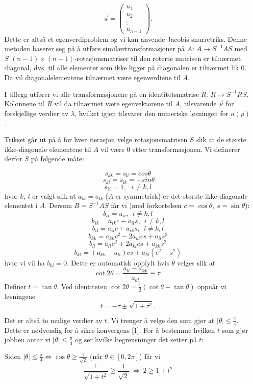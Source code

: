 \documentclass[norsk, 12pt]{article}
\newcommand{\f}{\frac}
\begin{document}
$$ \vec u  = \left(\begin{matrix} u_1 \\ u_2 \\ \vdots \\u_{n-1} \end{matrix}\right).$$
Dette er altså et egenverdiproblem og vi kan anvende Jacobis snurretriks.
Denne metoden baserer seg på å utføre similærtransformasjoner på $A$: $A \rightarrow S^{-1}AS$ med $S$ 
$(n-1)\times(n-1)$-rotasjonsmatriser til den roterte matrisen er tilnærmet diagonal, dvs. til alle elementer som 
ikke ligger på diagonalen er tilnærmet lik 0. Da vil diagonalelementene tilnærmet være egenverdiene til $A$.

I tillegg utfører vi alle transformasjonene på en identitetsmatrise $R$: $R \rightarrow S^{-1}RS$. Kolonnene til $R$ vil da
tilnærmet være egenvektorene til $A$, tilsvarende $\vec u$ for forskjellige verdier av $\lambda$, hvilket igjen 
tilsvarer den numeriske løsningen for $u(\rho)$.

Trikset går ut på å for hver iterasjon velge rotasjonsmatrisen $S$ slik at de største ikke-diagonale elementene til $A$
vil være 0 etter transformasjonen. Vi definerer derfor $S$ på følgende måte:

$$s_{kk} = s_{ll} = cos\theta$$
$$\ s_{kl} = s_{lk} = -sin\theta$$
$$s_{ii} = 1,\ \ \ i\neq k,l$$
hvor $k,\ l$ er valgt slik at $a_{kl}=a_{lk}$ ($A$ er symmetrisk) er det største ikke-diagonale elementet i $A$.
Dersom $B = S^{-1}AS$ får vi (med forkortelsen $c=\cos\theta,\ s=\sin\theta$):
$$b_{ii} = a_{ii},\ \ i\neq k,l$$
$$b_{ik} = a_{ik}c - a_{il}s,\ \ i\neq k,l$$
$$b_{il} = a_{il}c + a_{ik}s,\ \ i\neq k,l$$
$$b_{kk} = a_{kk}c^2-2a_{kl}cs+a_{ll}s^2$$
$$b_{ll} = a_{ll} c^2 +2a_{kl}cs + a_{kk}s^2$$
$$b_{kl} = (a_{kk}-a_{ll})cs+a_{kl}(c^2-s^2)$$
hvor vi  vil ha $b_{kl}=0$. Dette er automatisk oppfylt hvis $\theta$ velges slik at
$$\cot2\theta = \f{a_{ll}-a_{kk}}{a_{kl}}\equiv \tau.$$
Definer $t = \tan\theta$. Ved identiteten $\cot2\theta = \f{1}{2}(\cot\theta-\tan\theta)$ oppnår vi løsningene
$$t = -\tau\pm\sqrt{1+\tau^2}.$$


Det er altså to mulige verdier av $t$. Vi trenger å velge den som gjør at $|\theta|\leq\f{\pi}{4}$. Dette er nødvendig
for å sikre konvergens [1]. For å bestemme hvilken $t$ som gjør jobben antar vi $|\theta|\leq\f{\pi}{4}$ og ser hvilke
begrensninger det setter på $t$:

Siden $|\theta|\leq \f{\pi}{4} \Leftrightarrow \cos\theta \geq \f{1}{\sqrt{2}}$ (når $\theta\in [0,2\pi]$) får vi
$$\f{1}{\sqrt{1+t^2}} \geq \f{1}{\sqrt{2}}\  \Leftrightarrow\  2\geq1+t^2$$
\end{document}

